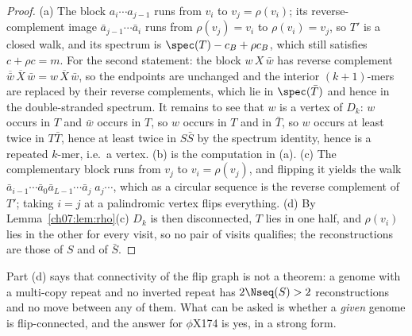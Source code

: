 \begin{proof}
(a) The block $a_i\cdots a_{j-1}$ runs from $v_i$ to $v_j=\rho(v_i)$; its reverse-complement
image $\bar a_{j-1}\cdots\bar a_i$ runs from $\rho(v_j)=v_i$ to $\rho(v_i)=v_j$, so $T'$ is a
closed walk, and its spectrum is $\spec(T)-c_B+\rho c_B$, which still satisfies $c+\rho c=m$.
For the second statement: the block $w\,X\,\bar w$ has reverse complement
$\overline{\bar w}\,\overline X\,\bar w=w\,\overline X\,\bar w$, so the endpoints are
unchanged and the interior $(k{+}1)$-mers are replaced by their reverse complements, which
lie in $\spec(\bar T)$ and hence in the double-stranded spectrum. It remains to see that $w$
is a vertex of $D_k$: $w$ occurs in $T$ and $\bar w$ occurs in $T$, so $w$ occurs in $T$ and
in $\bar T$, so $w$ occurs at least twice in $T\bar T$, hence at least twice in $S\bar S$ by
the spectrum identity, hence is a repeated $k$-mer, i.e.\ a vertex. (b) is the computation in
(a). (c) The complementary block runs from $v_j$ to $v_i=\rho(v_j)$, and flipping it yields
the walk $\bar a_{i-1}\cdots\bar a_{0}\bar a_{L-1}\cdots\bar a_{j}\;a_j\cdots$, which as a
circular sequence is the reverse complement of $T'$; taking $i=j$ at a palindromic vertex
flips everything. (d) By Lemma~\ref{ch07:lem:rho}(c) $D_k$ is then disconnected, $T$ lies in one
half, and $\rho(v_i)$ lies in the other for every visit, so no pair of visits qualifies; the
reconstructions are those of $S$ and of $\bar S$.
\end{proof}

Part (d) says that connectivity of the flip graph is not a theorem: a genome with a
multi-copy repeat and no inverted repeat has $2\Nseq(S)>2$ reconstructions and no move between
any of them. What can be asked is whether a \emph{given} genome is flip-connected, and the
answer for $\phi$X174 is yes, in a strong form.

